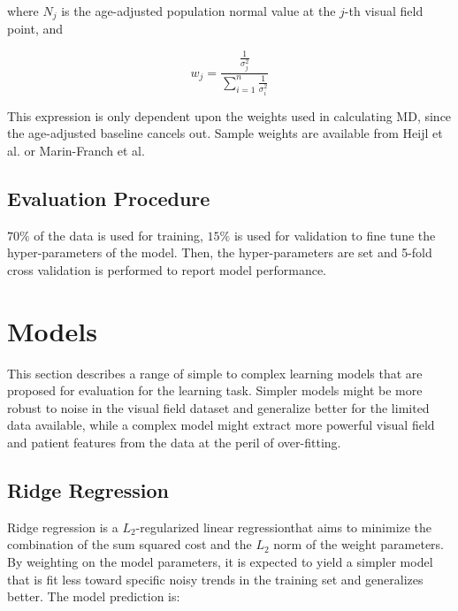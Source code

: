 where $N_j$ is the age-adjusted population normal value at the $j$-th visual field point, and 

\begin{equation}
w_j=\frac{ \frac{1}{\sigma_{j}^2} }{
	\sum\limits_{i=1}^{n} 
	\frac{1}{\sigma_{i}^2} 
}
\end{equation}

This expression is only dependent upon the weights used in calculating \ac{MD}, since the age-adjusted baseline cancels out. Sample weights are available from Heijl et al. \cite{Heijl1987} or Marin-Franch et al. \cite{Marin-Franch2013}

\subsection{Evaluation Procedure}

$70\%$ of the data is used for training, $15\%$ is used for validation to fine tune the hyper-parameters of the model. Then, the hyper-parameters are set and 5-fold cross validation is performed to report model performance. 

\section{Models}

This section describes a range of simple to complex learning models that are proposed for evaluation for the learning task. Simpler models might be more robust to noise in the visual field dataset and generalize better for the limited data available, while a complex model might extract more powerful visual field and patient features from the data at the peril of over-fitting. 

\subsection{Ridge Regression}

Ridge regression is a $L_2$-regularized linear regression\footnotemark that aims to minimize the combination of the sum squared cost and the $L_2$ norm of the weight parameters. By weighting on the model parameters, it is expected to yield a simpler model that is fit less toward specific noisy trends in the training set and generalizes better. The model prediction is: 


